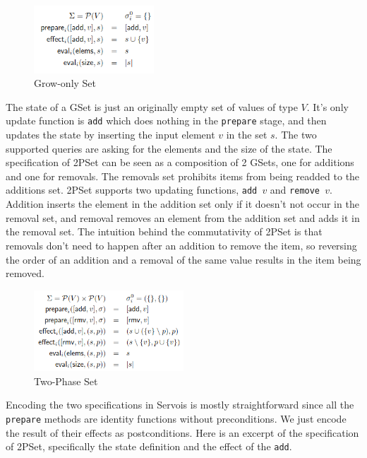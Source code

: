 \documentclass{article}
\begin{document}
\begin{figure}[h]
    \centering
    \includegraphics[width=0.4\textwidth]{grow-only-set-definition}
    \caption{Grow-only Set}
    \label{fig:gset-def}
\end{figure}

The state of a GSet is just an originally empty set of values of type
$V$. It's only update function is \texttt{add} which does nothing in
the \texttt{prepare} stage, and then updates the state by inserting
the input element $v$ in the set $s$. The two supported queries are
asking for the elements and the size of the state. The specification
of 2PSet can be seen as a composition of 2 GSets, one for additions
and one for removals. The removals set prohibits items from being
readded to the additions set. 2PSet supports two updating functions,
\texttt{add $v$} and \texttt{remove $v$}. Addition inserts the element
in the addition set only if it doesn't not occur in the removal set,
and removal removes an element from the addition set and adds it in
the removal set. The intuition behind the commutativity of 2PSet is
that removals don't need to happen after an addition to remove the
item, so reversing the order of an addition and a removal of the same
value results in the item being removed.


\begin{figure}[h]
    \centering
    \includegraphics[width=0.5\textwidth]{2pset-definition}
    \caption{Two-Phase Set}
    \label{fig:2pset-def}
\end{figure}

Encoding the two specifications in Servois is mostly straightforward
since all the \texttt{prepare} methods are identity functions without
preconditions. We just encode the result of their effects as
postconditions. Here is an excerpt of the specification of 2PSet,
specifically the state definition and the effect of the \texttt{add}.
\end{document}
